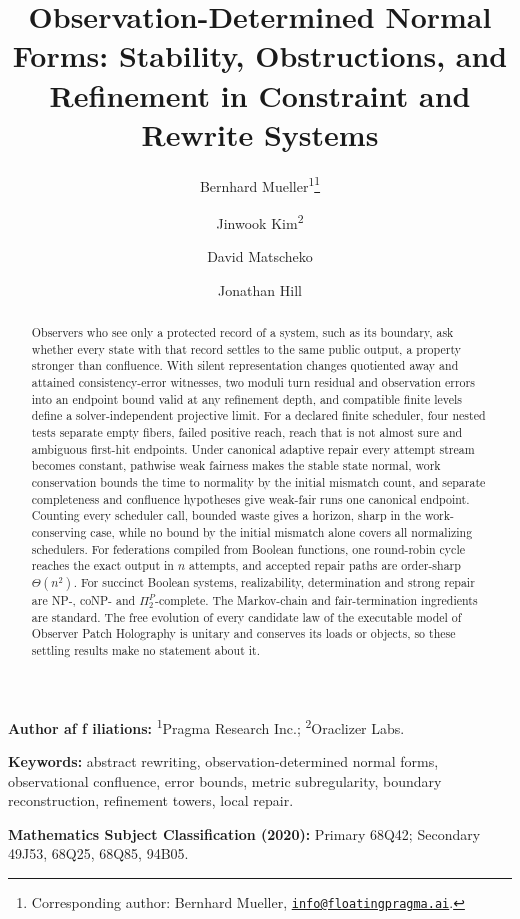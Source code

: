 \documentclass[11pt]{article}
\title{\textbf{Observation-Determined Normal Forms: Stability, Obstructions, and Refinement in Constraint and Rewrite Systems}}
\author{Bernhard Mueller\textsuperscript{1}\thanks{Corresponding author: Bernhard Mueller,
\href{mailto:info@floatingpragma.ai}{\texttt{info@floatingpragma.ai}}.}
\and Jinwook Kim\textsuperscript{2} \and David Matscheko \and Jonathan Hill}
\date{\OPHPaperReleaseDate}
\theoremstyle{definition}
\theoremstyle{remark}
\numberwithin{equation}{section}
\begin{document}
\maketitle
\OPHPaperReleaseBanner

\begin{center}
\small\textbf{Author af\kern0pt f\kern0pt iliations:} \textsuperscript{1}Pragma Research Inc.; \textsuperscript{2}Oraclizer Labs.
\end{center}

\begin{abstract}
Observers who see only a protected record of a system, such as its
boundary, ask whether every state with that record settles to the same
public output, a property stronger than confluence. With silent
representation changes quotiented away and attained consistency-error
witnesses, two moduli turn residual and observation errors into an endpoint
bound valid at any refinement depth, and compatible finite levels define a
solver-independent projective limit. For a declared finite scheduler, four
nested tests separate empty fibers, failed positive reach, reach that is not
almost sure and ambiguous first-hit endpoints. Under canonical adaptive
repair every attempt stream becomes constant, pathwise weak fairness makes
the stable state normal, work conservation bounds the time to normality by
the initial mismatch count, and separate completeness and confluence
hypotheses give weak-fair runs one canonical endpoint. Counting every
scheduler call, bounded waste gives a horizon, sharp in the work-conserving
case, while no bound by the initial mismatch alone covers all normalizing
schedulers. For federations compiled from Boolean functions, one round-robin
cycle reaches the exact output in \(n\) attempts, and accepted repair paths
are order-sharp \(\Theta(n^2)\). For succinct Boolean systems, realizability,
determination and strong repair are NP-, coNP- and \(\Pi_2^P\)-complete. The
Markov-chain and fair-termination ingredients are standard. The free
evolution of every candidate law of the executable model of Observer Patch
Holography is unitary and conserves its loads or objects, so these settling
results make no statement about it.
\end{abstract}

\medskip
\noindent\textbf{Keywords:} abstract rewriting, observation-determined normal forms, observational confluence, error bounds, metric subregularity, boundary reconstruction, refinement towers, local repair.

\noindent\textbf{Mathematics Subject Classification (2020):} Primary 68Q42; Secondary 49J53, 68Q25, 68Q85, 94B05.
\end{document}
